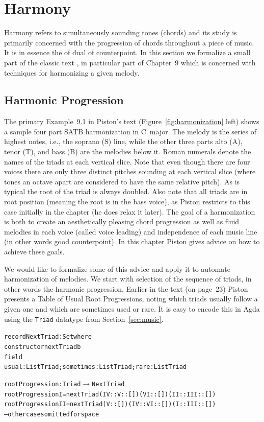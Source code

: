 \section{Harmony}
\label{sec:harmony}

Harmony refers to simultaneously sounding tones (chords) and its study
is primarily concerned with the progression of chords throughout a
piece of music. It is in essence the of dual of counterpoint. In this
section we formalize a small part of the classic text
\citet{piston-harmony}, in particular part of Chapter~9 which is
concerned with techniques for harmonizing a given melody.

\subsection{Harmonic Progression}
\label{sec:harmony:prog}

The primary Example~9.1 in Piston's text
(Figure~\ref{fig:harmonization} left) shows a
sample four part SATB harmonization in C~major. The melody is the
series of highest notes, i.e., the soprano (S) line, while the other three
parts alto (A), tenor (T), and bass (B) are the melodies below
it. Roman numerals denote the names of the triads at each vertical
slice. Note that even though there are four voices there are only
three distinct pitches sounding at each vertical slice (where tones an
octave apart are considered to have the same relative pitch). As is
typical the root of the triad is always doubled. Also note that all
triads are in root position (meaning the root is in the bass voice),
as Piston restricts to this case initially in the chapter (he does
relax it later). The goal of a harmonization is both to create an
aesthetically pleasing chord progression as well as fluid melodies in
each voice (called voice leading) and independence of each music
line (in other words good counterpoint). In this chapter
Piston gives advice on how to achieve these goals.

\Harmonization

We would like to formalize some of this advice and apply it to
automate harmonization of melodies. We start with selection of the
sequence of triads, in other words the harmonic progression. Earlier
in the text (on page~23) Piston presents a Table of Usual Root
Progressions, noting which triads usually follow a given one and
which are sometimes used or rare. It is easy to encode this in Agda
using the \texttt{Triad} datatype from Section~\ref{sec:music}.

\begin{alltt}
record NextTriad : Set where
  constructor nextTriadb
  field
    usual : List Triad; sometimes : List Triad; rare : List Triad

rootProgression : Triad \(\rightarrow\) NextTriad
rootProgression I   = nextTriad (IV :: V :: []) (VI :: []) (II :: III :: [])
rootProgression II  = nextTriad (V :: []) (IV  :: VI :: []) (I :: III :: [])
-- other cases omitted for space
\end{alltt}

